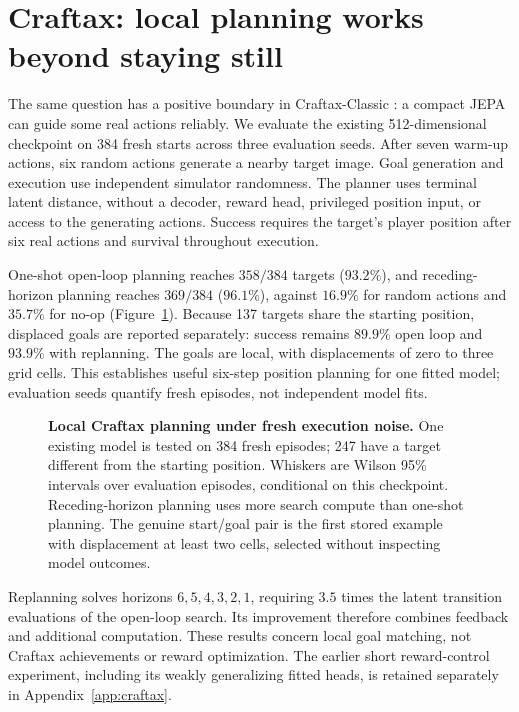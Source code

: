 \section{Craftax: local planning works beyond staying still}
\label{sec:craftax}

The same question has a positive boundary in Craftax-Classic \citep{matthews2024craftax}:
a compact JEPA can guide some real actions reliably. We evaluate the existing 512-dimensional
checkpoint on 384 fresh starts across three evaluation seeds. After seven warm-up actions, six
random actions generate a nearby target image. Goal generation and execution use independent
simulator randomness. The planner uses terminal latent distance, without a decoder, reward head,
privileged position input, or access to the generating actions. Success requires the target's player
position after six real actions and survival throughout execution.

One-shot open-loop planning reaches $358/384$ targets ($93.2\%$), and receding-horizon planning
reaches $369/384$ ($96.1\%$), against $16.9\%$ for random actions and $35.7\%$ for no-op
(Figure~\ref{fig:craftax}). Because 137 targets share the starting position, displaced goals are
reported separately: success remains $89.9\%$ open loop and $93.9\%$ with replanning. The goals are
local, with displacements of zero to three grid cells. This establishes useful six-step position
planning for one fitted model; evaluation seeds quantify fresh episodes, not independent model fits.

\begin{figure}[t]
\centering
{}
\caption{\textbf{Local Craftax planning under fresh execution noise.} One existing model is tested
on 384 fresh episodes; 247 have a target different from the starting position. Whiskers are Wilson
95\% intervals over evaluation episodes, conditional on this checkpoint. Receding-horizon planning
uses more search compute than one-shot planning. The genuine start/goal pair is the first stored
example with displacement at least two cells, selected without inspecting model outcomes.}
\label{fig:craftax}
\end{figure}

Replanning solves horizons $6,5,4,3,2,1$, requiring $3.5$ times the latent transition evaluations
of the open-loop search. Its improvement therefore combines feedback and additional computation.
These results concern local goal matching, not Craftax achievements or reward optimization. The
earlier short reward-control experiment, including its weakly generalizing fitted heads, is retained
separately in Appendix~\ref{app:craftax}.

